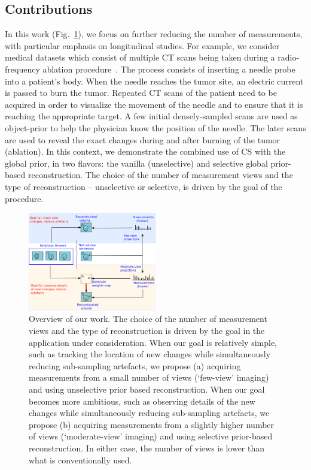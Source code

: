 \documentclass[journal]{IEEEtran}
\begin{document}
\subsection{\textbf{Contributions}}
\label{sec:contributions}
In this work (Fig.~\ref{fig:prior_overview}), we focus on further reducing the number of measurements, with  particular emphasis on longitudinal studies. For example, we consider medical datasets which consist of multiple CT scans being taken during a radio-frequency ablation procedure~\cite{Dong2015}. The process consists of inserting a needle probe into a patient's body. When the needle reaches the tumor site, an electric current is passed to burn the tumor. Repeated CT scans of the patient need to be acquired in order to visualize the movement of the needle and to ensure that it is reaching the appropriate target. A few initial densely-sampled scans are used as object-prior to help the physician know the position of the needle. The later scans are used to reveal the exact changes during and after burning of the tumor (ablation).  In this context, we demonstrate the combined use of CS with the global prior, in two flavors: the vanilla (unselective) and selective global prior-based reconstruction. The choice of the number of measurement views and the type of reconstruction -- unselective or selective, is driven by the goal of the procedure. 

\begin{figure}[h]
\centering
	\includegraphics[width=0.5\textwidth]{../images/prior_cmb.png}
        \caption{Overview of our work. The choice of the number of measurement views and the type of reconstruction is driven by the goal in the application under consideration.  When our goal is relatively simple, such as tracking the location of new changes while simultaneously reducing sub-sampling artefacts, we propose (a) acquiring measurements from a small number of views (`few-view' imaging) and using unselective prior based reconstruction. When our goal becomes more ambitious, such as observing details of the new changes while simultaneously reducing sub-sampling artefacts, we propose (b) acquiring measurements from a slightly higher number of views (`moderate-view' imaging) and using selective prior-based reconstruction. In either case, the number of views is lower than what is conventionally used.}
 \label{fig:prior_overview}
\end{figure}
\end{document}
